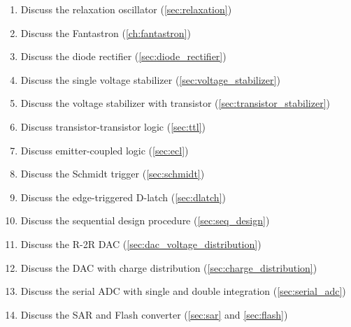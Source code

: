 \begin{enumerate}
	\item Discuss the relaxation oscillator (\ref{sec:relaxation})
	\item Discuss the Fantastron (\ref{ch:fantastron})
	\item Discuss the diode rectifier (\ref{sec:diode_rectifier})
	\item Discuss the single  voltage stabilizer (\ref{sec:voltage_stabilizer})
	\item Discuss the voltage stabilizer with transistor (\ref{sec:transistor_stabilizer})
	\item Discuss transistor-transistor logic (\ref{sec:ttl})
	\item Discuss emitter-coupled logic (\ref{sec:ecl})
	\item Discuss the Schmidt trigger (\ref{sec:schmidt})
	\item Discuss the edge-triggered D-latch (\ref{sec:dlatch})
	\item Discuss the sequential design procedure (\ref{sec:seq_design})
	\item Discuss the R-2R DAC (\ref{sec:dac_voltage_distribution})
	\item Discuss the DAC with charge distribution (\ref{sec:charge_distribution})
	\item Discuss the serial ADC with single and double integration (\ref{sec:serial_adc})
	\item Discuss the SAR and Flash converter (\ref{sec:sar} and \ref{sec:flash})
\end{enumerate}